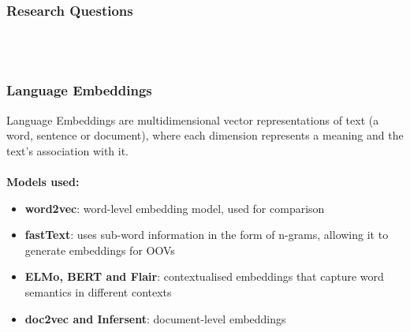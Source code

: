 \documentclass[english,svgnames,notes=hide,14pt,aspectratio=169]{beamer}
\begin{document}
\begin{frame}
\frametitle{Research Questions}
 \\~\\
\end{frame}

\begin{frame}
\frametitle{Language Embeddings}
Language Embeddings are multidimensional vector representations of text (a word, sentence or document), where each dimension represents a meaning and the text's association with it.
\\~\\
\textbf{Models used:}
\begin{itemize}
    \item \textbf{word2vec}: word-level embedding model, used for comparison
    \item \textbf{fastText}: uses sub-word information in the form of n-grams, allowing it to generate embeddings for OOVs
    \item \textbf{ELMo, BERT and Flair}: contextualised embeddings that capture word semantics in different contexts
    \item \textbf{doc2vec and Infersent}: document-level embeddings
\end{itemize}
\end{frame}

\end{document}
